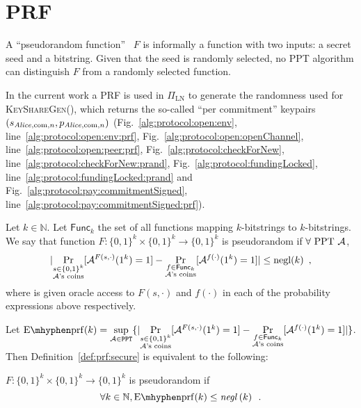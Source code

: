 \section{PRF}
  A ``pseudorandom function''~\cite{katzlindell} $F$ is informally a function
  with two inputs: a secret seed and a bitstring. Given that the seed is
  randomly selected, no PPT algorithm can distinguish $F$ from a randomly
  selected function.

  In the current work a PRF is used in $\Pi_{\mathrm{LN}}$ to generate the
  randomness used for \textsc{KeyShareGen}(), which returns the so-called ``per
  commitment'' keypairs $(s_{\mathit{Alice}, \mathrm{com}, n}, p_{\mathit{Alice}, \mathrm{com},
  n})$ (Fig.~\ref{alg:protocol:open:env}, line~\ref{alg:protocol:open:env:prf},
  Fig.~\ref{alg:protocol:open:openChannel},
  line~\ref{alg:protocol:open:peer:prf}, Fig.~\ref{alg:protocol:checkForNew},
  line~\ref{alg:protocol:checkForNew:prand},
  Fig.~\ref{alg:protocol:fundingLocked},
  line~\ref{alg:protocol:fundingLocked:prand} and
  Fig.~\ref{alg:protocol:pay:commitmentSigned},
  line~\ref{alg:protocol:pay:commitmentSigned:prf}).

  \begin{definition}
    \label{def:prf:secure}
    Let $k \in \mathbb{N}$. Let $\mathsf{Func}_k$ the set of all functions
    mapping $k$-bitstrings to $k$-bitstrings. We say that function $F: \{0,
    1\}^k \times \{0, 1\}^k \rightarrow \{0, 1\}^k$ is pseudorandom if $\forall
    \text{ PPT } \mathcal{A}$,
    \begin{equation*}
      |\underset{\substack{s \in \{0, 1\}^k \\ \mathcal{A}\text{'s
      coins}}}{\Pr}[\mathcal{A}^{F(s, \cdot)}(1^k) = 1] - \underset{\substack{f
      \in \mathsf{Func}_k \\ \mathcal{A}\text{'s
      coins}}}{\Pr}[\mathcal{A}^{f(\cdot)}(1^k) = 1]| \leq \text{negl}(k) \enspace,
    \end{equation*}
    where \adversary{} is given oracle access to $F(s, \cdot)$ and $f(\cdot)$ in
    each of the probability expressions above respectively.
  \end{definition}

    Let $\mathrm{E \mhyphen prf}(k) = \underset{\adversary \in
    \mathtt{PPT}}{\sup}\{|\underset{\substack{s \in \{0, 1\}^k \\
    \adversary\text{'s coins}}}{\Pr}[\adversary^{F(s, \cdot)}(1^k) = 1] -
    \underset{\substack{f \in \mathsf{Func}_k \\ \adversary\text{'s
    coins}}}{\Pr}[\adversary^{f(\cdot)}(1^k) = 1]|\}$. Then
    Definition~\ref{def:prf:secure} is equivalent to the following:

    \begin{definition}
      \label{def:prf:secure:sup}
      $F: \{0, 1\}^k \times \{0, 1\}^k \rightarrow \{0, 1\}^k$ is pseudorandom
      if
      \begin{equation*}
        \forall k \in \mathbb{N}, \mathrm{E \mhyphen prf}(k) \leq
        \mathit{negl}\left(k\right) \enspace.
      \end{equation*}
    \end{definition}
